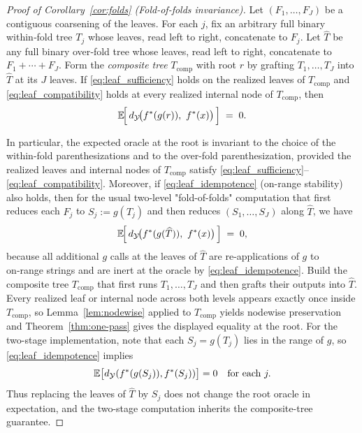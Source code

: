 \begin{proof}[Proof of Corollary~\ref{cor:folds} (Fold-of-folds invariance)]
\label{proof:cor-folds}
Let $(F_1,\ldots,F_J)$ be a contiguous coarsening of the leaves. For each $j$, fix an arbitrary full
binary within‑fold tree $T_j$ whose leaves, read left to right, concatenate to $F_j$. Let $\widehat T$ be any full
binary over‑fold tree whose leaves, read left to right, concatenate to $F_1+\cdots+F_J$. Form the
\emph{composite tree} $T_{\mathrm{comp}}$ with root $r$ by grafting $T_1,\ldots,T_J$ into $\widehat T$ at its $J$ leaves.
If \eqref{eq:leaf_sufficiency} holds on the realized leaves of $T_{\mathrm{comp}}$ and \eqref{eq:leaf_compatibility} holds at every realized internal node of $T_{\mathrm{comp}}$, then
\[
\E\!\Big[\,\metric\!\big(\fstar(g(r)),\ \fstar(x)\big)\,\Big]\;=\;0.
\]

In particular, the expected oracle at the root is invariant to the choice of the within-fold parenthesizations and to the over-fold parenthesization, provided the realized leaves and internal nodes of $T_{\mathrm{comp}}$ satisfy \eqref{eq:leaf_sufficiency}–\eqref{eq:leaf_compatibility}. Moreover, if \eqref{eq:leaf_idempotence} (on-range stability) also holds, then for the usual two-level "fold-of-folds" computation that first reduces each $F_j$ to $S_j:=g(T_j)$ and then reduces $(S_1,\ldots,S_J)$ along $\widehat T$, we have
\[
\E\!\Big[\,\metric\!\big(\fstar(g(\widehat T)),\ \fstar(x)\big)\,\Big]\;=\;0,
\]
because all additional $g$ calls at the leaves of $\widehat T$ are re‑applications of $g$ to on‑range strings and are inert at the oracle by \eqref{eq:leaf_idempotence}.
Build the composite tree $T_{\mathrm{comp}}$ that first runs $T_1,\ldots,T_J$ and then grafts their outputs into $\widehat T$. Every realized leaf or internal node across both levels appears exactly once inside $T_{\mathrm{comp}}$, so Lemma~\ref{lem:nodewise} applied to $T_{\mathrm{comp}}$ yields nodewise preservation and Theorem~\ref{thm:one-pass} gives the displayed equality at the root. For the two-stage implementation, note that each $S_j=g(T_j)$ lies in the range of $g$, so \eqref{eq:leaf_idempotence} implies
\[
\mathbb{E}\big[d_{\mathcal{Y}}(f^{\ast}(g(S_j)),f^{\ast}(S_j))\big]=0
\quad\text{for each }j.
\]
Thus replacing the leaves of $\widehat T$ by $S_j$ does not change the root oracle in expectation, and the two-stage computation inherits the composite-tree guarantee.
\end{proof}



